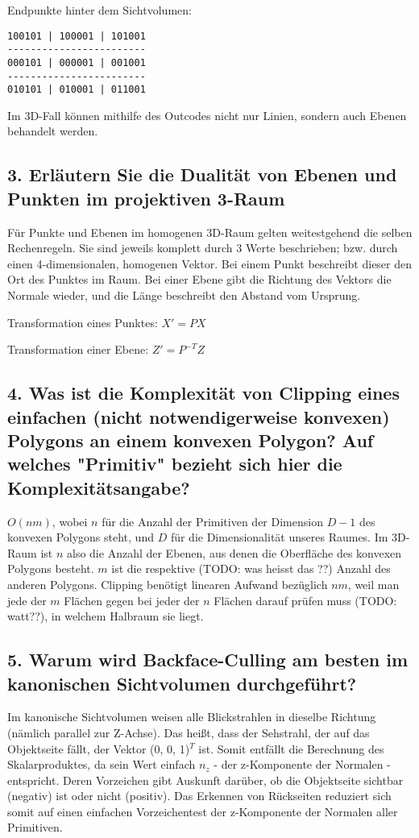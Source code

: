 \documentclass[a4paper,headings=small]{scrartcl}
\numberwithin{equation}{section} %
\numberwithin{figure}{section}   %
\begin{document}
Endpunkte hinter dem Sichtvolumen:
\begin{verbatim}
100101 | 100001 | 101001
------------------------
000101 | 000001 | 001001
------------------------
010101 | 010001 | 011001
\end{verbatim}

Im 3D-Fall können mithilfe des Outcodes nicht nur Linien, sondern auch Ebenen behandelt werden.

\subsection{3. Erläutern Sie die Dualität von Ebenen und Punkten im projektiven 3-Raum}
Für Punkte und Ebenen im homogenen 3D-Raum gelten weitestgehend die selben Rechenregeln. Sie sind jeweils komplett durch 3 Werte beschrieben; bzw. durch einen 4-dimensionalen, homogenen Vektor. Bei einem Punkt beschreibt dieser den Ort des Punktes im Raum. Bei einer Ebene gibt die Richtung des Vektors die Normale wieder, und die Länge beschreibt den Abstand vom Ursprung.

Transformation eines Punktes: $X' = P X$

Transformation einer Ebene: $Z' = P^{-T} Z$

\subsection{4. Was ist die Komplexität von Clipping eines einfachen (nicht notwendigerweise konvexen) Polygons an einem konvexen Polygon? Auf welches "Primitiv" bezieht sich hier die Komplexitätsangabe?}

$O(n m)$, wobei $n$ für die Anzahl der Primitiven der Dimension $D - 1$ des konvexen Polygons steht, und $D$ für die Dimensionalität unseres Raumes. Im 3D-Raum ist $n$ also die Anzahl der Ebenen,  aus denen die Oberfläche des konvexen Polygons besteht. $m$ ist die respektive (TODO: was heisst das ??) Anzahl des anderen Polygons. Clipping benötigt linearen Aufwand bezüglich $n m$, weil man jede der $m$ Flächen gegen bei jeder der $n$ Flächen darauf prüfen muss (TODO: watt??), in welchem Halbraum sie liegt.

\subsection{5. Warum wird Backface-Culling am besten im kanonischen Sichtvolumen durchgeführt?}

Im kanonische Sichtvolumen weisen alle Blickstrahlen in dieselbe Richtung (nämlich parallel zur Z-Achse).
Das heißt, dass der Sehstrahl, der auf das Objektseite fällt, der Vektor (0, 0, 1)$^T$ ist.
Somit entfällt die Berechnung des Skalarproduktes, da sein Wert einfach $n_z$ - der z-Komponente der Normalen - entspricht.
Deren Vorzeichen gibt Auskunft darüber, ob die Objektseite sichtbar (negativ) ist oder nicht (positiv).
Das Erkennen von Rückseiten reduziert sich somit auf einen einfachen Vorzeichentest der z-Komponente der Normalen aller Primitiven.
\end{document}
